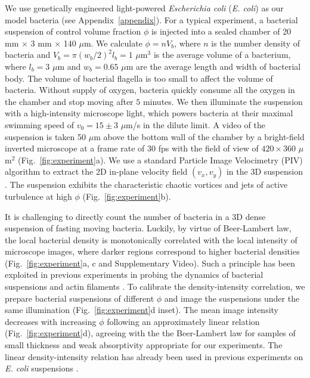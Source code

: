 \documentclass[twocolumn,aps,prx,amsmath,amssymb,longbibliography]{revtex4-2}
\begin{document}
We use genetically engineered light-powered \textit{Escherichia coli} (\textit{E. coli}) as our model bacteria (see Appendix~\ref{appendix}).
For a typical experiment, a bacterial suspension of control volume fraction $\phi$ is injected into a sealed chamber of 20 mm $\times$ 3 mm $\times$ 140 $\mu$m. We calculate $\phi = n V_b$, where $n$ is the number density of bacteria and $V_b = \pi (w_b/2)^2 l_b = 1$ $\mu$m$^3$ is the average volume of a bacterium, where $l_b = 3$ $\mu$m and $w_b = 0.65$ $\mu$m are the average length and width of bacterial body. The volume of bacterial flagella is too small to affect the volume of bacteria.
Without supply of oxygen, bacteria quickly consume all the oxygen in the chamber and stop moving after $5$ minutes.
We then illuminate the suspension with a high-intensity microscope light, which powers bacteria at their maximal swimming speed of $v_0 = 15 \pm 3$ $\mu$m/s in the dilute limit.
A video of the suspension is taken 50 $\mu$m above the bottom wall of the chamber by a bright-field inverted microscope at a frame rate of $30$ fps with the field of view of $420 \times 360$ $\mu$m$^2$ (Fig.~\ref{fig:experiment}a).
We use a standard Particle Image Velocimetry (PIV) algorithm %
to extract the 2D in-plane velocity field $(v_x,v_y)$ in the 3D suspension \cite{Liberzon2020}. The suspension exhibits the characteristic chaotic vortices and jets of active turbulence at high $\phi$ (Fig.~\ref{fig:experiment}b).

It is challenging to directly count the number of bacteria in a 3D dense suspension of fasting moving bacteria. Luckily, by virtue of Beer-Lambert law, the local bacterial density is monotonically correlated with the local intensity of microscope images, where darker regions correspond to higher bacterial densities (Fig.~\ref{fig:experiment}a, c and Supplementary Video). Such a principle has been exploited in previous experiments in probing the dynamics of bacterial suspensions and actin filaments \cite{Sokolov2009, Wilson2011, Schaller2013}. To calibrate the density-intensity correlation, we prepare bacterial suspensions of different $\phi$ and image the suspensions under the same illumination (Fig.~\ref{fig:experiment}d inset). The mean image intensity decreases with increasing $\phi$ following an approximately linear relation (Fig.~\ref{fig:experiment}d), agreeing with the the Beer-Lambert law for samples of small thickness and weak absorptivity appropriate for our experiments. The linear density-intensity relation has already been used in previous experiments on \textit{E. coli} suspensions \cite{Wilson2011}.
\end{document}
